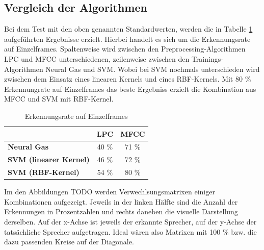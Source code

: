 \subsection{Vergleich der Algorithmen}
Bei dem Test mit den oben genannten Standardwerten, werden die in Tabelle \ref{tbl:vergleich} aufgeführten Ergebnisse erzielt. Hierbei handelt es sich um die Erkennungsrate auf Einzelframes. Spaltenweise wird zwischen den Preprocessing-Algorithmen LPC und MFCC unterschiedenen, zeilenweise zwischen den Trainings-Algorithmen Neural Gas und SVM. Wobei bei SVM nochmals unterschieden wird zwischen dem Einsatz eines linearen Kernels und eines RBF-Kernels. Mit 80 \% Erkennungrate auf Einzelframes das beste Ergebniss erzielt die Kombination aus MFCC und SVM mit RBF-Kernel.

\begin{table}[h]
	\centering
	\label{tbl:vergleich}
	\begin{tabular}{l|c|c}			
		& \textbf{LPC} & \textbf{MFCC} \\
		\hline
		\textbf{Neural Gas} & 40 \% & 71 \% \\
		\textbf{SVM (linearer Kernel)} & 46 \% & 72 \% \\
		\textbf{SVM (RBF-Kernel)} & 54 \% & 80 \% \\
	\end{tabular}
	\caption{Erkennungsrate auf Einzelframes}
\end{table}

Im den Abbildungen TODO werden Verwechlsungsmatrixen einiger Kombinationen aufgezeigt. Jeweils in der linken Hälfte sind die Anzahl der Erkennungen in Prozentzahlen und rechts daneben die visuelle Darstellung derselben. Auf der x-Achse ist jeweils der erkannte Sprecher, auf der y-Achse der tatsächliche Sprecher aufgetragen. Ideal wären also Matrixen mit 100 \% bzw. die dazu passenden Kreise auf der Diagonale.

\setlength{\tabcolsep}{6pt} %
\renewcommand{\arraystretch}{1.1} %

